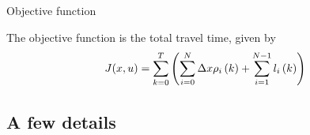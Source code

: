 \documentclass[xcolor=svgnames, english, smaller]{beamer}
\theoremstyle{plain}
\theoremstyle{definition}
\theoremstyle{plain}
\theoremstyle{plain}
\begin{document}


\begin{frame}{Objective function}

The objective function is the total travel time, given by
\[
J(x, u) = \sum_{k = 0}^{T} \left( \sum_{i = 0}^{N} \Delta x \rho_{i}\left(k\right) + \sum_{i = 1}^{N - 1} l_{i}\left(k\right) \right)
\]


\end{frame}


\subsection{A few details}
\end{document}
